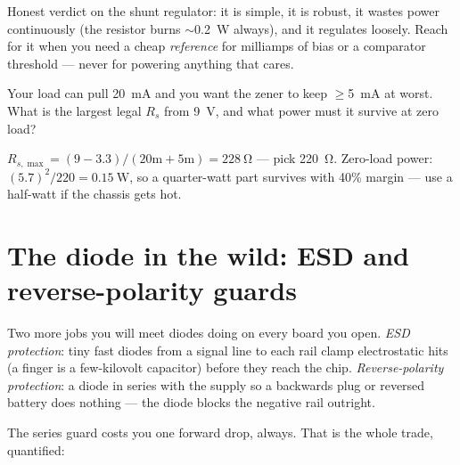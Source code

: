 Honest verdict on the shunt regulator: it is simple, it is robust, it
wastes power continuously (the resistor burns $\sim$\qty{0.2}{\watt}
always), and it regulates loosely. Reach for it when you need a cheap
\emph{reference} for milliamps of bias or a comparator threshold ---
never for powering anything that cares.

\begin{exercise}[medium]
Your load can pull \qty{20}{\milli\ampere} and you want the zener to
keep $\ge$\qty{5}{\milli\ampere} at worst. What is the largest legal
$R_s$ from \qty{9}{\volt}, and what power must it survive at zero load?
\begin{solution}
$R_{s,\max}=(9-3.3)/(20\text{m}+5\text{m})=\qty{228}{\ohm}$ ---
pick \qty{220}{\ohm}. Zero-load power:
$(5.7)^2/220=\qty{0.15}{\watt}$, so a quarter-watt part survives with
40\% margin --- use a half-watt if the chassis gets hot.
\end{solution}
\end{exercise}

\section{The diode in the wild: ESD and reverse-polarity guards}\label{sec:diode-wild}

Two more jobs you will meet diodes doing on every board you open.
\emph{ESD protection}: tiny fast diodes from a signal line to each rail
clamp electrostatic hits (a finger is a few-kilovolt capacitor) before
they reach the chip. \emph{Reverse-polarity protection}: a diode in
series with the supply so a backwards plug or reversed battery does
nothing --- the diode blocks the negative rail outright.

The series guard costs you one forward drop, always. That is the whole
trade, quantified:


